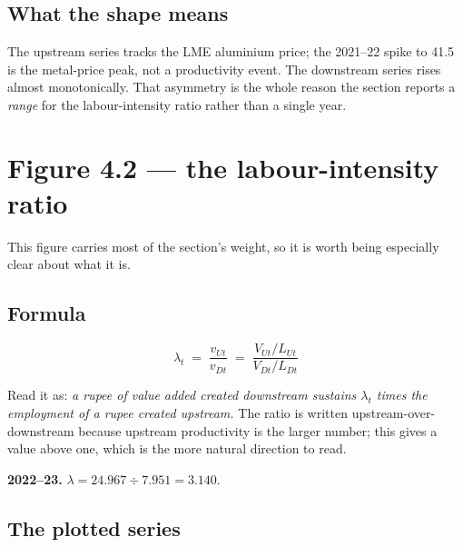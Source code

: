 \documentclass[11pt, a4paper]{article}
\begin{document}
\subsection{What the shape means}

The upstream series tracks the LME aluminium price; the 2021--22 spike to 41.5 is the
metal-price peak, not a productivity event. The downstream series rises almost
monotonically. That asymmetry is the whole reason the section reports a \emph{range}
for the labour-intensity ratio rather than a single year.

\section{Figure 4.2 --- the labour-intensity ratio}
\label{sec:fig43}

This figure carries most of the section's weight, so it is worth being especially
clear about what it is.

\subsection{Formula}
\[
\lambda_t \;=\; \frac{v_{Ut}}{v_{Dt}}
\;=\; \frac{V_{Ut}/L_{Ut}}{V_{Dt}/L_{Dt}}
\]

\noindent Read it as: \emph{a rupee of value added created downstream sustains
$\lambda_t$ times the employment of a rupee created upstream.} The ratio is written
upstream-over-downstream because upstream productivity is the larger number; this
gives a value above one, which is the more natural direction to read.

\begin{work}
\textbf{2022--23.} $\lambda = 24.967 \div 7.951 = \mathbf{3.140}$.
\end{work}

\subsection{The plotted series}

\begin{table}[H]
\centering\footnotesize
{}
\end{table}
\end{document}
